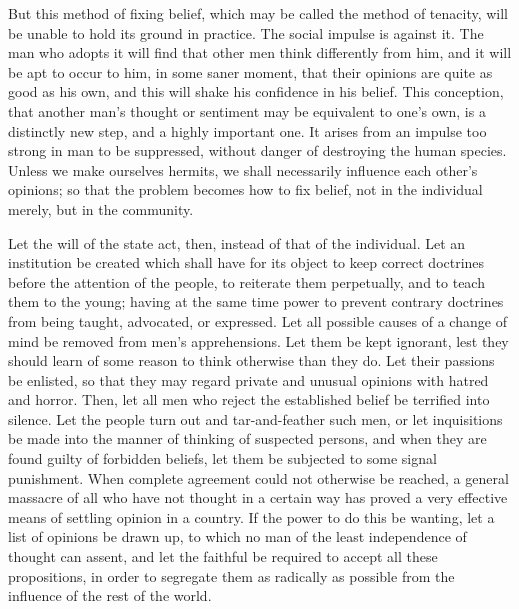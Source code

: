 \documentclass[]{article}
\begin{document}
But this method of fixing belief, which may be called the method of tenacity, will be unable to hold its ground in practice. The social impulse is against it. The man who adopts it will find that other men think differently from him, and it will be apt to occur to him, in some saner moment, that their opinions are quite as good as his own, and this will shake his confidence in his belief. This conception, that another man's thought or sentiment may be equivalent to one's own, is a distinctly new step, and a highly important one. It arises from an impulse too strong in man to be suppressed, without danger of destroying the human species. Unless we make ourselves hermits, we shall necessarily influence each other's opinions; so that the problem becomes how to fix belief, not in the individual merely, but in the community.

Let the will of the state act, then, instead of that of the individual. Let an institution be created which shall have for its object to keep correct doctrines before the attention of the people, to reiterate them perpetually, and to teach them to the young; having at the same time power to prevent contrary doctrines from being taught, advocated, or expressed. Let all possible causes of a change of mind be removed from men's apprehensions. Let them be kept ignorant, lest they should learn of some reason to think otherwise than they do. Let their passions be enlisted, so that they may regard private and unusual opinions with hatred and horror. Then, let all men who reject the established belief be terrified into silence. Let the people turn out and tar-and-feather such men, or let inquisitions be made into the manner of thinking of suspected persons, and when they are found guilty of forbidden beliefs, let them be subjected to some signal punishment. When complete agreement could not otherwise be reached, a general massacre of all who have not thought in a certain way has proved a very effective means of settling opinion in a country. If the power to do this be wanting, let a list of opinions be drawn up, to which no man of the least independence of thought can assent, and let the faithful be required to accept all these propositions, in order to segregate them as radically as possible from the influence of the rest of the world.
\end{document}
